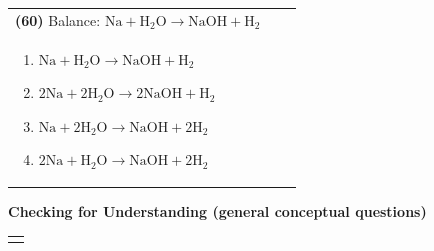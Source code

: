\documentclass{article}
\begin{document}
{\vspace{0.2cm}
\noindent \begin{tabular}{|p{0.9\linewidth}|}
\hline
\vspace{0.2cm}
\textbf{(60)} Balance: $\mathrm{Na + H_2O \rightarrow NaOH + H_2}$\\
\begin{minipage}[t]{0.85\linewidth}
\begin{enumerate}[label=\alph*.]
\item $\mathrm{Na + H_2O \rightarrow NaOH + H_2}$
\item $\mathrm{2Na + 2H_2O \rightarrow 2NaOH + H_2}$
\item $\mathrm{Na + 2H_2O \rightarrow NaOH + 2H_2}$
\item $\mathrm{2Na + H_2O \rightarrow NaOH + 2H_2}$
\end{enumerate}
\end{minipage}\\
\hline
\end{tabular}

\newpage
{\large\textbf{Checking for Understanding (general conceptual questions)}}\\
\noindent \begin{tabular}{|p{0.9\linewidth}|}
\hline
\vspace{0.2cm}


\end{tabular}}
\end{document}
